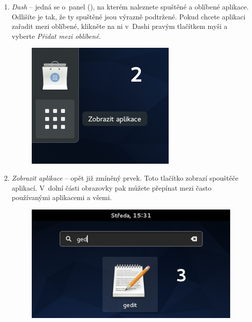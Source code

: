 \begin{enumerate}
\item \emph{Dash} -- jedná se o~panel (), na kterém naleznete spuštěné a oblíbené aplikace. Odlišíte je tak, že ty spuštěné jsou výrazně podtržené. Pokud chcete aplikaci zařadit mezi oblíbené, klikněte na ni v~Dashi pravým tlačítkem myši a vyberte \emph{Přidat mezi oblíbené}.

\begin{figure}[t]
\begin{center}
\includegraphics[width=\textwidth]{img/dash-a}
 \label{fig:dash-a}
\end{center}
\end{figure}

\item \emph{Zobrazit aplikace} -- opět již zmíněný prvek. Toto tlačítko zobrazí spouštěče aplikací. V~dolní části obrazovky pak můžete přepínat mezi často používanými aplikacemi a všemi.

\begin{figure}[t]
\begin{center}
\includegraphics[width=\textwidth]{img/vyhledavani}
 \label{fig:vyhledavani}
\end{center}
\end{figure}


\end{enumerate}
